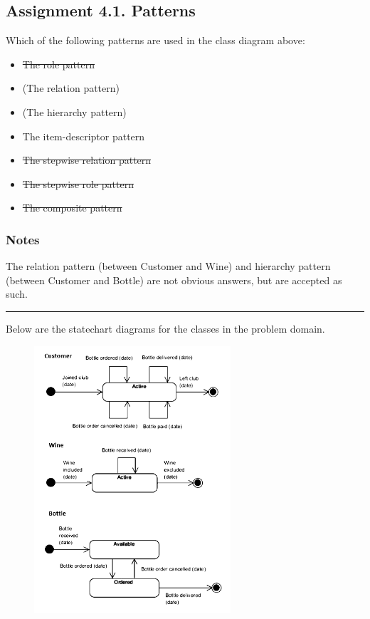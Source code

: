 \subsection{Assignment 4.1. Patterns}
Which of the following patterns are used in the class diagram above:
\begin{itemize}
    \item \sout{The role pattern}
    \item (The relation pattern)
    \item (The hierarchy pattern)
    \item The item-descriptor pattern
    \item \sout{The stepwise relation pattern}
    \item \sout{The stepwise role pattern}
    \item \sout{The composite pattern}
\end{itemize}
\subsubsection*{Notes}
The relation pattern (between Customer and Wine) and hierarchy pattern (between Customer and Bottle) are not obvious answers, but are accepted as such.
\begin{center}
    \rule{10cm}{.4pt}
\end{center}
Below are the statechart diagrams for the classes in the problem domain.

\begin{figure}[H]
    \centering
    \includegraphics[width=0.65\textwidth]{figures/assignment4statechart2018.png}
\end{figure}

